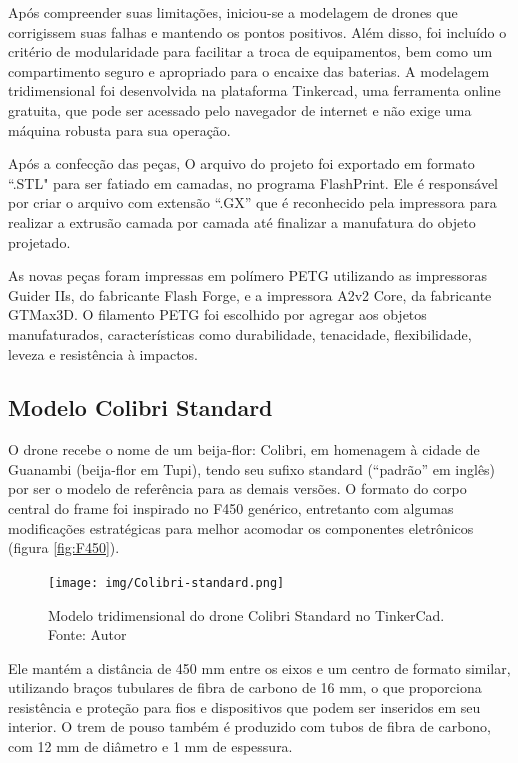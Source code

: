 \documentclass[conference]{IEEEtran}
\begin{document}
Após compreender suas limitações, iniciou-se a modelagem de drones que corrigissem suas falhas e mantendo os pontos positivos. Além disso, foi incluído o critério de modularidade para facilitar a troca de equipamentos, bem como um compartimento seguro e apropriado para o encaixe das baterias. A modelagem tridimensional foi desenvolvida na plataforma Tinkercad, uma ferramenta online gratuita, que pode ser acessado pelo navegador de internet e não exige uma máquina robusta para sua operação.

Após a confecção das peças, O arquivo do projeto foi exportado em formato “.STL" para ser fatiado em camadas, no programa FlashPrint. Ele é responsável por criar o arquivo com extensão “.GX” que é reconhecido pela impressora para realizar a extrusão camada por camada até finalizar a manufatura do objeto projetado.

As novas peças foram impressas em polímero PETG utilizando as impressoras Guider IIs, do fabricante Flash Forge, e a impressora A2v2 Core, da fabricante GTMax3D. O filamento PETG foi escolhido por agregar aos objetos manufaturados, características como durabilidade, tenacidade, flexibilidade, leveza e resistência à impactos.

\subsection{Modelo Colibri Standard}

O drone recebe o nome de um beija-flor: Colibri, em homenagem à cidade de Guanambi (beija-flor em Tupi), tendo seu sufixo standard (“padrão” em inglês) por ser o modelo de referência para as demais versões. O formato do corpo central do frame foi inspirado no F450 genérico, entretanto com algumas modificações estratégicas para melhor acomodar os componentes eletrônicos (figura \ref{fig:F450}).

\begin{figure}[!htb]
    \centering
    \texttt{[image: img/Colibri-standard.png]} 
    \caption{Modelo tridimensional do drone Colibri Standard no TinkerCad. Fonte: Autor}
    \label{fig:ColibriStandard}
\end{figure}

Ele mantém a distância de 450 mm entre os eixos e um centro de formato similar, utilizando braços tubulares de fibra de carbono de 16 mm, o que proporciona resistência e proteção para fios e dispositivos que podem ser inseridos em seu interior. O trem de pouso também é produzido com tubos de fibra de carbono, com 12 mm de diâmetro e 1 mm de espessura. 
\end{document}
